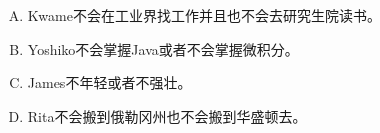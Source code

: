 {    %
    \begin{practices}
        \begin{enumerate}[A.]
            \item Kwame不会在工业界找工作并且也不会去研究生院读书。
            \item Yoshiko不会掌握Java或者不会掌握微积分。
            \item James不年轻或者不强壮。
            \item Rita不会搬到俄勒冈州也不会搬到华盛顿去。
        \end{enumerate}
    \end{practices}
}
